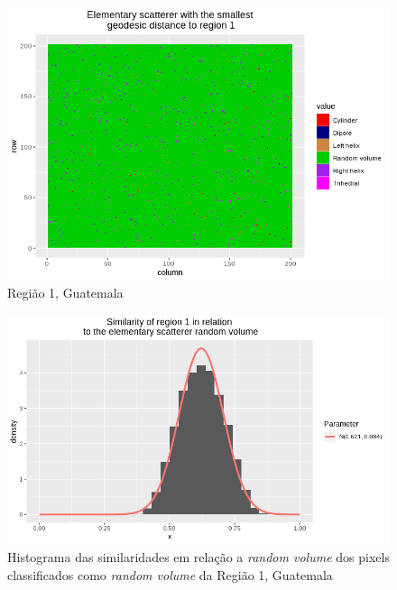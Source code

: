 \documentclass[12pt]{article}
\begin{document}
\begin{figure}[!h]
    \centering    
    \includegraphics[width = \linewidth]{../../Images/Report_18_12_20/Classifier_Geo_Dist/Class_Map/Guate/region1_predomain.png}
    \caption{Região 1, Guatemala}
    \label{fig:class_map_r1}
\end{figure}

\begin{figure}[!h]
    \centering   
    \includegraphics[width = 0.95\linewidth]{../../Images/Report_18_12_20/Classifier_Geo_Dist/Histograms/Guate/region1_rv_sm_filter.png}
    \caption{Histograma das similaridades em relação a \textit{random volume} dos pixels classificados como \textit{random volume} da Região 1, Guatemala}
    \label{fig:class_hist_r1_rv}
\end{figure}
\end{document}
